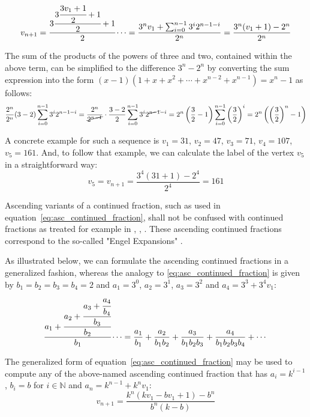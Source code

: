 \begin{equation}
\label{eq:asc_continued_fraction}
v_{n+1}=\cfrac{3\cfrac{3\cfrac{3v_1+1}{2}+1}{2}+1}{2}\dotsb
=\frac{3^nv_1+\sum_{i=0}^{n-1}3^i2^{n-1-i}}{2^n}
=\frac{3^n(v_1+1)-2^n}{2^n}
\end{equation}

\par\medskip
The sum of the products of the powers of three and two, contained within the above term, can be simplified to the difference $3^n-2^n$ by converting the sum expression into the form $(x-1)(1+x+x^2+\cdots+x^{n-2}+x^{n-1})=x^n-1$ as follows:
\[
\frac{2^n}{2^n}(3-2)\sum_{i=0}^{n-1}3^i2^{n-1-i}
=\frac{2^n}{\cancel{2^{n-1}}}\cdot\frac{3-2}{2}\sum_{i=0}^{n-1}3^i2^{\cancel{n-1}-i}
=2^n\left(\frac{3}{2}-1\right)\sum_{i=0}^{n-1}\left(\frac{3}{2}\right)^i
=2^n\left(\left(\frac{3}{2}\right)^n-1\right)
\]

\begin{example}
	A concrete example for such a sequence is $v_1=31$, $v_2=47$, $v_3=71$, $v_4=107$, $v_5=161$. And, to follow that example, we can calculate the label of the vertex $v_5$ in a straightforward way:
	\[
	v_5=v_{n+1}=\frac{3^4(31+1)-2^4}{2^4}=161
	\]
\end{example}

\begin{remark}
	Ascending variants of a continued fraction, such as used in equation~\ref{eq:asc_continued_fraction}, shall not be confused with continued fractions as treated for example in \cite{Ref_Moore}, \cite{Ref_Hensley}, \cite{Ref_Borwe_etal}. These ascending continued fractions correspond to the so-called "Engel Expansions" \cite{Ref_Kraaikamp_Wu}.
\end{remark}

\par\noindent
As illustrated below, we can formulate the ascending continued fractions in a generalized fashion, whereas the analogy to \ref{eq:asc_continued_fraction} is given by $b_1=b_2=b_3=b_4=2$ and $a_1=3^0$, $a_2=3^1$, $a_3=3^2$ and $a_4=3^3+3^4v_1$:
\[
\cfrac{a_1+\cfrac{a_2+\cfrac{a_3+\cfrac{a_4}{b_4}}{b_3}}{b_2}}{b_1}\dotsb=\frac{a_1}{b_1}+\frac{a_2}{b_1b_2}+\frac{a_3}{b_1b_2b_3}+\frac{a_4}{b_1b_2b_3b_4}+\cdots
\]

The generalized form of equation~\ref{eq:asc_continued_fraction} may be used to compute any of the above-named ascending continued fraction that has $a_i=k^{i-1}$, $b_i=b$ for $i\in\mathbb{N}$ and $a_n=k^{n-1}+k^nv_1$:
\begin{equation}
\label{eq:generalized_asc_continued_fraction}
v_{n+1}=\frac{k^n(kv_1-bv_1+1)-b^n}{b^n(k-b)}
\end{equation}

